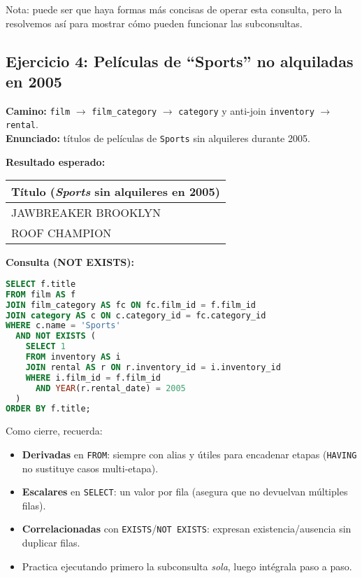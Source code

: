 \documentclass[12pt,a4paper]{article}
\begin{document}
Nota: puede ser que haya formas más concisas de operar esta consulta, pero la resolvemos así para mostrar cómo pueden funcionar las subconsultas.

\subsection*{Ejercicio 4: Películas de ``Sports'' no alquiladas en 2005}
\textbf{Camino:} \texttt{film} $\rightarrow$ \texttt{film\_category} $\rightarrow$ \texttt{category} y anti-join \texttt{inventory} $\rightarrow$ \texttt{rental}. \\
\textbf{Enunciado:} títulos de películas de \texttt{Sports} sin alquileres durante 2005.


\textbf{Resultado esperado:}
\begin{center}
\begin{tabular}{l}
\hline
Título (\textit{Sports} sin alquileres en 2005) \\
\hline
JAWBREAKER BROOKLYN \\
ROOF CHAMPION \\
\hline
\end{tabular}
\end{center}

\textbf{Consulta (NOT EXISTS):}
\begin{lstlisting}[language=SQL]
SELECT f.title
FROM film AS f
JOIN film_category AS fc ON fc.film_id = f.film_id
JOIN category AS c ON c.category_id = fc.category_id
WHERE c.name = 'Sports'
  AND NOT EXISTS (
    SELECT 1
    FROM inventory AS i
    JOIN rental AS r ON r.inventory_id = i.inventory_id
    WHERE i.film_id = f.film_id
      AND YEAR(r.rental_date) = 2005
  )
ORDER BY f.title;
\end{lstlisting}


\vspace{1em}

Como cierre, recuerda:
\begin{itemize}
  \item \textbf{Derivadas} en \texttt{FROM}: siempre con alias y útiles para encadenar etapas (\texttt{HAVING} no sustituye casos multi-etapa).
  \item \textbf{Escalares} en \texttt{SELECT}: un valor por fila (asegura que no devuelvan múltiples filas).
  \item \textbf{Correlacionadas} con \texttt{EXISTS}/\texttt{NOT EXISTS}: expresan existencia/ausencia sin duplicar filas.
  \item Practica ejecutando primero la subconsulta \textit{sola}, luego intégrala paso a paso.
\end{itemize}
\end{document}
